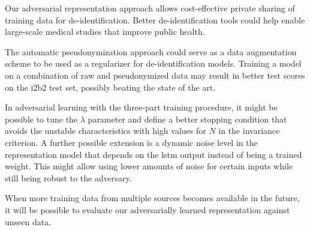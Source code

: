 %
Our adversarial representation approach allows cost-effective private sharing of training data for de-identification.
%
Better de-identification tools could help enable large-scale medical studies that improve public health.

%
The automatic pseudonymization approach could serve as a data augmentation scheme to be used as a regularizer for de-identification models.
%
Training a model on a combination of raw and pseudonymized data may result in better test scores on the i2b2 test set, possibly beating the state of the art.

%
In adversarial learning with the three-part training procedure, it might be possible to tune the $\lambda$ parameter and define a better stopping condition that avoids the unstable characteristics with high values for $N$ in the invariance criterion.
%
A further possible extension is a dynamic noise level in the representation model that depends on the \ac{lstm} output instead of being a trained weight.
%
This might allow using lower amounts of noise for certain inputs while still being robust to the adversary.


%
When more training data from multiple sources becomes available in the future, it will be possible to evaluate our adversarially learned representation against unseen data.

